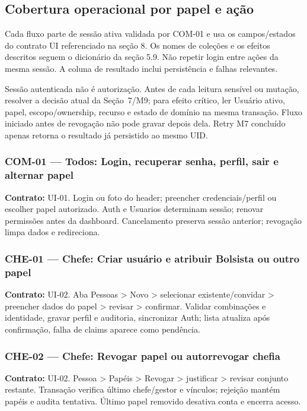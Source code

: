 \subsection{Cobertura operacional por papel e ação}
\label{sec:fluxos-completos}
Cada fluxo parte de sessão ativa validada por COM-01 e usa os campos/estados do contrato UI referenciado na seção 8. Os nomes de coleções e os efeitos descritos seguem o dicionário da seção 5.9. Não repetir login entre ações da mesma sessão. A coluna de resultado inclui persistência e falhas relevantes.

\begin{regra}
Sessão autenticada não é autorização. Antes de cada leitura sensível ou
mutação, resolver a decisão atual da Seção~7/M9; para efeito crítico, ler
Usuário ativo, papel, escopo/ownership, recurso e estado de domínio na mesma
transação. Fluxo iniciado antes de revogação não pode gravar depois dela. Retry
M7 concluído apenas retorna o resultado já persistido ao mesmo UID.
\end{regra}

\subsubsection{COM-01 --- Todos: Login, recuperar senha, perfil, sair e alternar papel}
\textbf{Contrato:} UI-01. Login ou foto do header; preencher credenciais/perfil ou escolher papel autorizado. Auth e Usuarios determinam sessão; renovar permissões antes da dashboard. Cancelamento preserva sessão anterior; revogação limpa dados e redireciona.

\subsubsection{CHE-01 --- Chefe: Criar usuário e atribuir Bolsista ou outro papel}
\textbf{Contrato:} UI-02. Aba Pessoas > Novo > selecionar existente/convidar > preencher dados do papel > revisar > confirmar. Validar combinações e identidade, gravar perfil e auditoria, sincronizar Auth; lista atualiza após confirmação, falha de claims aparece como pendência.

\subsubsection{CHE-02 --- Chefe: Revogar papel ou autorrevogar chefia}
\textbf{Contrato:} UI-02. Pessoa > Papéis > Revogar > justificar > revisar conjunto restante. Transação verifica último chefe/gestor e vínculos; rejeição mantém papéis e audita tentativa. Último papel removido desativa conta e encerra acesso.

